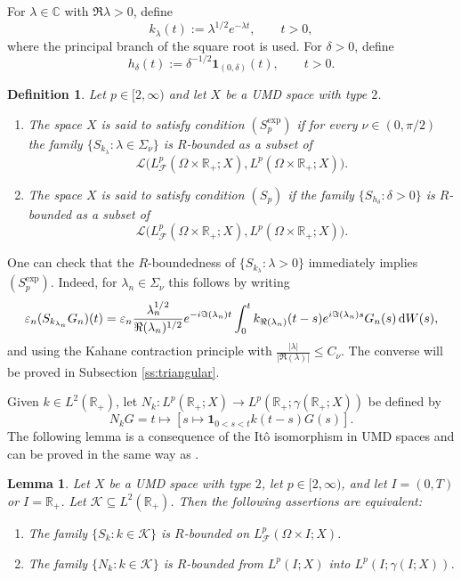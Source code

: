 \documentclass{amsart}
\let\leq\leqslant
\theoremstyle{plain}
\theoremstyle{remark}
\theoremstyle{plain}
\newtheorem{lemma}[theorem]{Lemma}
\newtheorem{definition}[theorem]{Definition}
\numberwithin{equation}{section}
\newcommand{\C}{\mathbb C}
\newcommand{\R}{\mathbb R}
\newcommand{\1}{\mathbf 1}
\newcommand{\dd}{\,{\rm d}}
\begin{document}
For $\lambda\in\C$ with $\Re\lambda>0$, define
\[
        k_\lambda(t):=\lambda^{1/2}e^{-\lambda t},
        \qquad t>0,
\]
where the principal branch of the square root is used.
For $\delta>0$, define
\[
        h_\delta(t):=\delta^{-1/2}\1_{(0,\delta)}(t),
        \qquad t>0.
\]
\begin{definition}\label{def:Rbddconv}
Let $p \in [2,\infty)$ and let $X$ be a UMD space with type $2$.
\begin{enumerate}[\rm (1)]
\item The space $X$ is said to satisfy condition $(S_p^{\exp})$ if for every $\nu\in (0,\pi/2)$ the family $\{S_{k_\lambda}:\lambda\in \Sigma_{\nu}\}$
is $R$-bounded as a subset of
\[
    \mathscr L\big(L^p_{\mathscr F}(\Omega\times\mathbb R_+;X),L^p(\Omega\times\mathbb R_+;X) \big).
\]
\item The space $X$ is said to satisfy condition $(S_p)$ if the family $\{S_{h_{\delta}}:\delta>0\}$
is $R$-bounded as a subset of $$ \mathscr L\big(L^p_{\mathscr F}(\Omega\times\mathbb R_+;X),L^p(\Omega\times\mathbb R_+;X) \big).$$
\end{enumerate}
\end{definition}


One can check that the $R$-boundedness of $\{S_{k_\lambda}:\lambda>0\}$ immediately implies $(S_p^{\exp})$. Indeed, for $\lambda_n\in \Sigma_{\nu}$ this follows by writing
\begin{align*}
\varepsilon_n (S_{k_{\lambda_n}} G_n)(t)  =  \varepsilon_n \frac{\lambda^{1/2}_n}{\Re(\lambda_n)^{1/2}} e^{-i\Im(\lambda_n)t}  \int_0^t  k_{\Re(\lambda_n)}(t-s) e^{i\Im(\lambda_n)s} G_n(s)\dd W(s),
\end{align*}
and using the  Kahane contraction principle with $\frac{|\lambda|}{|\Re(\lambda)|} \leq C_{\nu}$. The converse will be proved in Subsection \ref{ss:triangular}.  

Given $k\in L^2(\R_+)$, let $N_k:L^p(\R_+;X)\to L^p(\R_+;\gamma(\R_+;X))$ be defined by
\[N_kG = t \mapsto [s\mapsto \1_{0<s<t}k(t-s)G(s)].\]
The following lemma is a consequence of the It\^o isomorphism in UMD spaces and can be proved in the same way as \cite[Theorem 7.1]{NVW-Rbounded}.
\begin{lemma}\label{lem:gammaRbdd}
Let $X$ be a UMD space with type $2$, let
$p\in[2,\infty)$, and let $I=(0,T)$ or $I=\R_+$. Let $\mathcal{K}\subseteq L^2(\R_+)$.
Then the following assertions are equivalent:
\begin{enumerate}[label={\rm(\arabic*)}, leftmargin=*]
\item The family $\{S_k:k\in \mathcal{K}\}$ is $R$-bounded on $L^p_{\mathscr F}(\Omega\times I;X)$.
\item The family $\{N_k:k\in \mathcal{K}\}$ is $R$-bounded from $L^p(I;X)$ into $L^p(I;\gamma(I;X))$.
\end{enumerate}
\end{lemma}
\end{document}
